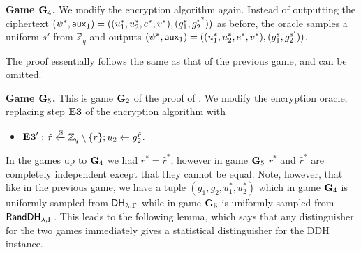 \textbf{Game $\mathbf{G}_4$.} We modify the encryption algorithm again. Instead of outputting the ciphertext $(\psi^{*}, \mathsf{aux}_1) = ((u_1^{*}, u_2^{*}, e^{*}, v^{*}), (g_1^{s}, g_2^{r^2}))$ as before, the oracle samples a uniform $s'$ from $\mathbb{Z}_{q}$ and outputs $(\psi^{*}, \mathsf{aux}_1) = ((u_1^{*}, u_2^{*}, e^{*}, v^{*}), (g_1^{s}, g_2^{s'}))$. 

The proof essentially follows the same as that of the previous game, and can be omitted.

\textbf{Game $\mathbf{G}_5$.} This is game $\mathbf{G}_2$ of the proof of \cite{cs01}. We modify the encryption oracle, replacing step $\mathbf{E3}$ of the encryption algorithm with
\begin{itemize}
	\item[] $\mathbf{E3}':$ $\hat{r}\xleftarrow{\$}\mathbb{Z}_q\setminus\{r\}; u_2\gets g_2^{\hat{r}}$.
\end{itemize}
In the games up to $\mathbf{G}_4$ we had $r^{*} = \hat{r}^{*}$, however in game $\mathbf{G}_5$ $r^{*}$ and $\hat{r}^{*}$ are completely independent except that they cannot be equal. Note, however, that like in the previous game, we have a tuple $(g_1, g_2, u_1^{*}, u_2^{*})$ which in game $\mathbf{G}_4$ is uniformly sampled from $\mathsf{DH}_{\lambda,\Gamma}$ while in game $\mathbf{G}_5$ is uniformly sampled from $\mathsf{RandDH}_{\lambda,\Gamma}$. This leads to the following lemma, which says that any distinguisher for the two games immediately gives a statistical distinguisher for the DDH instance.


